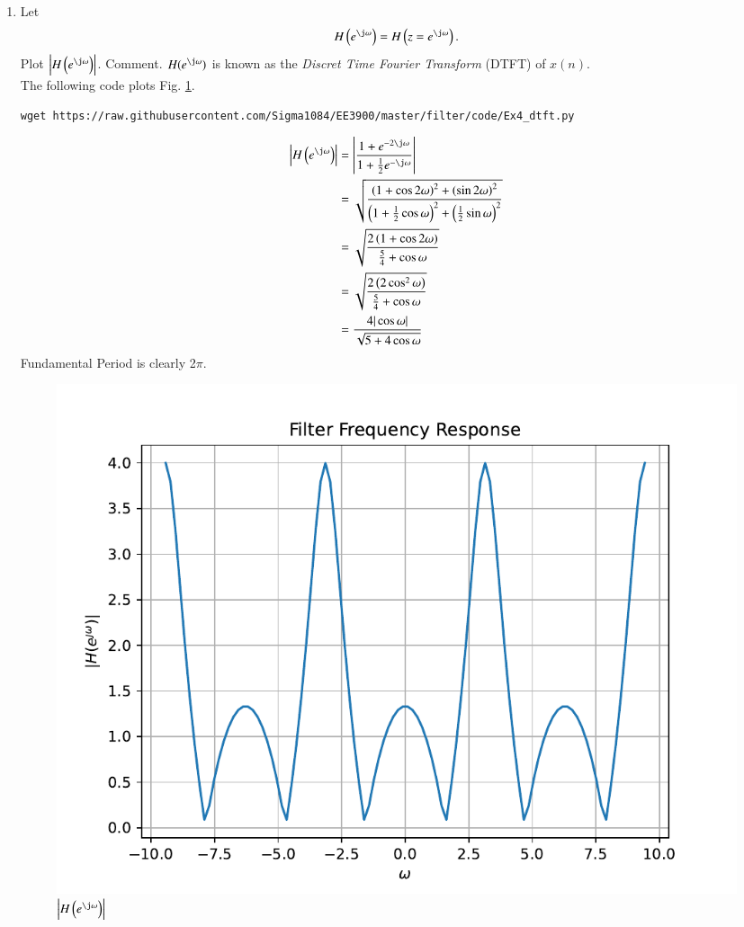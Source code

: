 \documentclass[journal,12pt,twocolumn]{IEEEtran}
\renewcommand\thesection{\arabic{section}}
\begin{document}
\begin{enumerate}[label=\thesection.\arabic*]
\item 
Let
\begin{equation}
H\brak{e^{\j \omega}} = H\brak{z = e^{\j \omega}}.
\end{equation}
Plot $\abs{H\brak{e^{\j \omega}}}$.  Comment.  $H(e^{\j \omega})$ is
known as the {\em Discret Time Fourier Transform} (DTFT) of $x(n)$.
\\
\solution The following code plots Fig. \ref{fig:dtft}.
\begin{lstlisting}
wget https://raw.githubusercontent.com/Sigma1084/EE3900/master/filter/code/Ex4_dtft.py
\end{lstlisting}
\begin{align*}
	\left|H\brak{e^{\j\omega}}\right| &= \left|\frac{1 + e^{-2\j\omega}}{1 + \frac{1}{2}e^{-\j\omega}}\right| \\
									  &= \sqrt{\frac{\brak{1 + \cos{2\omega}}^2 + \brak{\sin{2\omega}}^2}{\brak{1 + \frac{1}{2}\cos{\omega}}^2 + \brak{\frac{1}{2}\sin{\omega}}^2}}\\
									  &= \sqrt{\frac{2\brak{1 + \cos{2\omega}}}{\frac{5}{4} + \cos{\omega}}} \\
									  &= \sqrt{\frac{2\brak{2\cos^2{\omega}}}{\frac{5}{4} + \cos{\omega}}} \\
									  &= \frac{4|\cos{\omega}|}{\sqrt{5 + 4\cos{\omega}}}
\end{align*}
Fundamental Period is clearly 2$\pi$.

\begin{figure}[!ht]
\centering
\includegraphics[width=\columnwidth]{./figs/dtft}
\caption{$\abs{H\brak{e^{\j\omega}}}$}
\label{fig:dtft}
\end{figure}


\end{enumerate}
\end{document}
